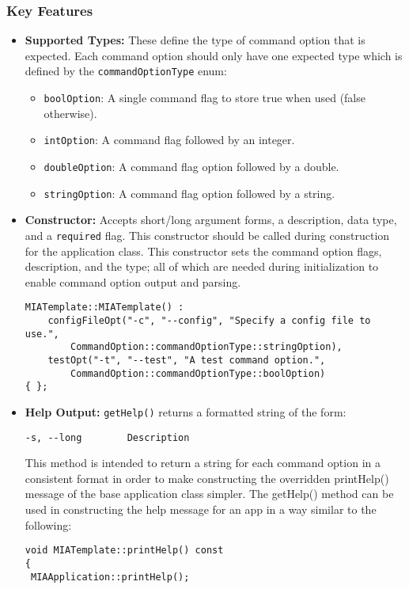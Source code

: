 \subsubsection*{Key Features}
\begin{itemize}
	\item \textbf{Supported Types:} These define the type of command option that is expected. Each command option should only have one expected type which is defined by the \texttt{commandOptionType} enum:
	\begin{itemize}
		\item \texttt{boolOption}: A single command flag to store true when used (false otherwise).
		\item \texttt{intOption}: A command flag followed by an integer.
		\item \texttt{doubleOption}: A command flag option followed by a double.
		\item \texttt{stringOption}: A command flag option followed by a string.
	\end{itemize}
	
	\item \textbf{Constructor:} Accepts short/long argument forms, a description, data type, and a \texttt{required} flag. This constructor should be called during construction for the application class. This constructor sets the command option flags, description, and the type; all of which are needed during initialization to enable command option output and parsing.
	\begin{lstlisting}[style=cppstyle]
MIATemplate::MIATemplate() : 
    configFileOpt("-c", "--config", "Specify a config file to use.",
        CommandOption::commandOptionType::stringOption),
    testOpt("-t", "--test", "A test command option.",
        CommandOption::commandOptionType::boolOption)            
{ };
	\end{lstlisting}
	
	\item \textbf{Help Output:} \texttt{getHelp()} returns a formatted string of the form:
	\begin{lstlisting}
-s, --long        Description
	\end{lstlisting}
	This method is intended to return a string for each command option in a consistent format in order to make constructing the overridden printHelp() message of the base application class simpler. The getHelp() method can be used in constructing the help message for an app in a way similar to the following:
	\begin{lstlisting}[style=cppstyle]
void MIATemplate::printHelp() const
{
 MIAApplication::printHelp();
 

\end{lstlisting}
\end{itemize}
